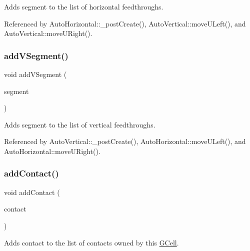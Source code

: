 Adds {\ttfamily segment} to the list of horizontal feedthroughs. 

Referenced by Auto\+Horizontal\+::\+\_\+post\+Create(), Auto\+Vertical\+::move\+U\+Left(), and Auto\+Vertical\+::move\+U\+Right().

\mbox{\label{classKatabatic_1_1GCell_a8aa815e9e99df8187e628f6ec9e9da77}} 
\subsubsection{\texorpdfstring{add\+V\+Segment()}{addVSegment()}}
{\footnotesize\ttfamily void add\+V\+Segment (\begin{DoxyParamCaption}\item[{\hyperlink{classKatabatic_1_1AutoSegment}{Auto\+Segment} $\ast$}]{segment }\end{DoxyParamCaption})\hspace{0.3cm}{\ttfamily [inline]}}

Adds {\ttfamily segment} to the list of vertical feedthroughs. 

Referenced by Auto\+Vertical\+::\+\_\+post\+Create(), Auto\+Horizontal\+::move\+U\+Left(), and Auto\+Horizontal\+::move\+U\+Right().

\mbox{\label{classKatabatic_1_1GCell_a2b84aab620bfca1064e988e94e7b9c59}} 
\subsubsection{\texorpdfstring{add\+Contact()}{addContact()}}
{\footnotesize\ttfamily void add\+Contact (\begin{DoxyParamCaption}\item[{\hyperlink{classKatabatic_1_1AutoContact}{Auto\+Contact} $\ast$}]{contact }\end{DoxyParamCaption})\hspace{0.3cm}{\ttfamily [inline]}}

Adds {\ttfamily contact} to the list of contacts owned by this \hyperlink{classKatabatic_1_1GCell}{G\+Cell}. 

